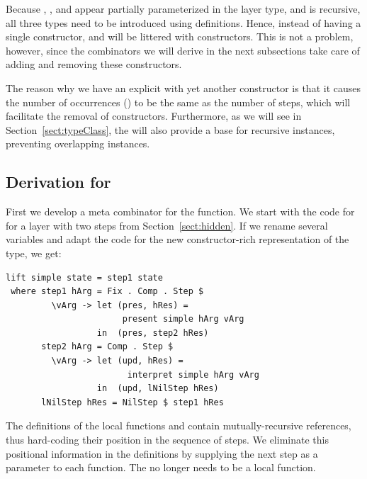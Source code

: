 \documentclass[preprint,natbib]{sigplanconf}
\begin{document}
Because , , and   appear partially parameterized in the layer type, and  is recursive, all three types need to be introduced using  definitions. Hence, instead of having a single  constructor,  and  will be littered with constructors. This is not a problem, however, since the combinators we will derive in the next subsections take care of adding and removing these constructors.

The reason why we have an explicit  with yet another constructor is that it causes the number of occurrences () to be the same as the number of steps, which will facilitate the removal of  constructors. Furthermore, as we will see in Section~\ref{sect:typeClass}, the  will also provide a base for recursive instances, preventing overlapping instances.


%																
\subsection{Derivation for }\label{subsect:liftDerivation}

First we develop a meta combinator for the  function. We start with the code for  for a layer with two steps from Section~\ref{sect:hidden}. If we rename several variables and adapt the code for the new constructor-rich representation of the  type, we get:


\begin{small} %
\begin{verbatim}
lift simple state = step1 state 
 where step1 hArg = Fix . Comp . Step $
         \vArg -> let (pres, hRes) = 
                       present simple hArg vArg
                  in  (pres, step2 hRes)
       step2 hArg = Comp . Step $
         \vArg -> let (upd, hRes) = 
                        interpret simple hArg vArg
                  in  (upd, lNilStep hRes)
       lNilStep hRes = NilStep $ step1 hRes
\end{verbatim}%
\end{small}

The definitions of the local functions  and  contain mutually-recursive references, thus hard-coding their position in the sequence of steps. We eliminate this positional information in the definitions by supplying the next step as a parameter to each function. The  no longer needs to be a local function.
\end{document}
